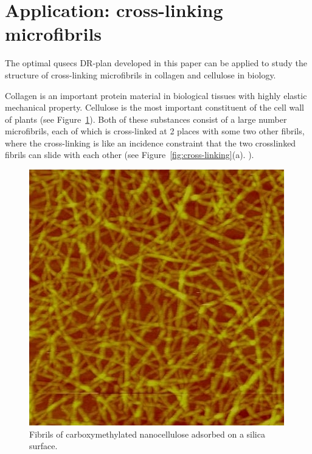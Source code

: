 \section{Application: cross-linking microfibrils}

The optimal qusecs DR-plan developed in this paper can be applied to study 
the structure of  cross-linking microfibrils in collagen and cellulose in biology. 

Collagen is an important protein material in biological tissues with highly elastic mechanical property. 
Cellulose is the most important constituent of the cell wall of plants (see Figure~\ref{fig:cellulose}). 
Both of these substances consist of a large number microfibrils,
each of which is cross-linked at 2 places with some two other fibrils, 
where the cross-linking is like an incidence constraint that 
the two crosslinked fibrils can slide with each other (see Figure~\ref{fig:cross-linking}(a). ).

%
%
%
%
%
%



\begin{figure}[hbtp]
\centering
\includegraphics[width=0.5\linewidth]{img/AFM_Innventia_nanocellulose}
\caption{Fibrils of carboxymethylated nanocellulose adsorbed on a silica surface. \cite{xxx}}
\label{fig:cellulose}
\end{figure}




